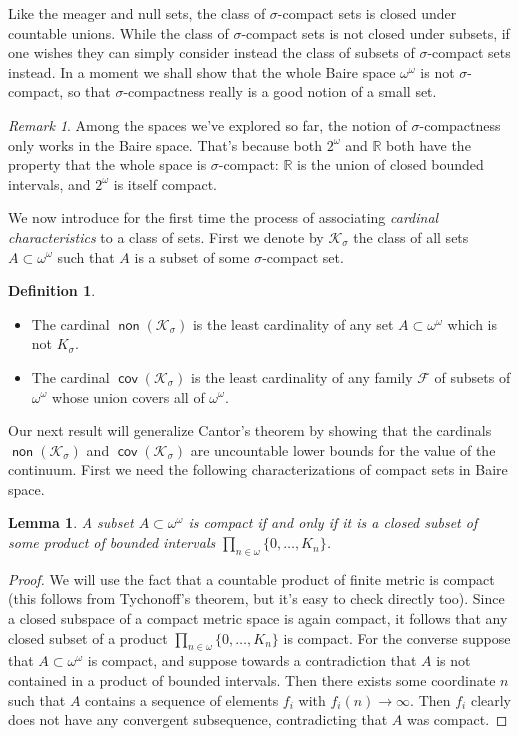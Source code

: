 \documentclass[11pt,oneside]{amsbook}
\newcommand{\RR}{\mathbb R}
\newcommand{\Ksigma}{\mathcal K_\sigma}
\DeclareMathOperator{\non}{\mathsf{non}}
\DeclareMathOperator{\cov}{\mathsf{cov}}
\theoremstyle{definition}
\theoremstyle{plain}
\newtheorem{lem}[thm]{Lemma}
\theoremstyle{definition}
\newtheorem{defn}[thm]{Definition}
\theoremstyle{remark}
\newtheorem{rem}[thm]{Remark}
\begin{document}
Like the meager and null sets, the class of $\sigma$-compact sets is closed under countable unions. While the class of $\sigma$-compact sets is not closed under subsets, if one wishes they can simply consider instead the class of subsets of $\sigma$-compact sets instead. In a moment we shall show that the whole Baire space $\omega^\omega$ is not $\sigma$-compact, so that $\sigma$-compactness really is a good notion of a small set.

\begin{rem}
  Among the spaces we've explored so far, the notion of $\sigma$-compactness only works in the Baire space. That's because both $2^\omega$ and $\RR$ both have the property that the whole space is $\sigma$-compact: $\RR$ is the union of closed bounded intervals, and $2^\omega$ is itself compact.
\end{rem}

We now introduce for the first time the process of associating \emph{cardinal characteristics} to a class of sets. First we denote by $\Ksigma$ the class of all sets $A\subset\omega^\omega$ such that $A$ is a subset of some $\sigma$-compact set.

\begin{defn}
  \begin{itemize}
  \item The cardinal $\non(\Ksigma)$ is the least cardinality of any set $A\subset\omega^\omega$ which is not $K_\sigma$.
  \item The cardinal $\cov(\Ksigma)$ is the least cardinality of any family $\mathcal F$ of subsets of $\omega^\omega$ whose union covers all of $\omega^\omega$.
  \end{itemize}
\end{defn}

Our next result will generalize Cantor's theorem by showing that the cardinals $\non(\Ksigma)$ and $\cov(\Ksigma)$ are uncountable lower bounds for the value of the continuum. First we need the following characterizations of compact sets in Baire space.

\begin{lem}
  \label{lem:baire-compact}
  A subset $A\subset\omega^\omega$ is compact if and only if it is a closed subset of some product of bounded intervals $\prod_{n\in\omega}\{0,\ldots,K_n\}$.
\end{lem}

\begin{proof}
  We will use the fact that a countable product of finite metric is compact (this follows from Tychonoff's theorem, but it's easy to check directly too). Since a closed subspace of a compact metric space is again compact, it follows that any closed subset of a product $\prod_{n\in\omega}\{0,\ldots,K_n\}$ is compact. For the converse suppose that $A\subset\omega^\omega$ is compact, and suppose towards a contradiction that $A$ is not contained in a product of bounded intervals. Then there exists some coordinate $n$ such that $A$ contains a sequence of elements $f_i$ with $f_i(n)\to\infty$. Then $f_i$ clearly does not have any convergent subsequence, contradicting that $A$ was compact.
\end{proof}
\end{document}
